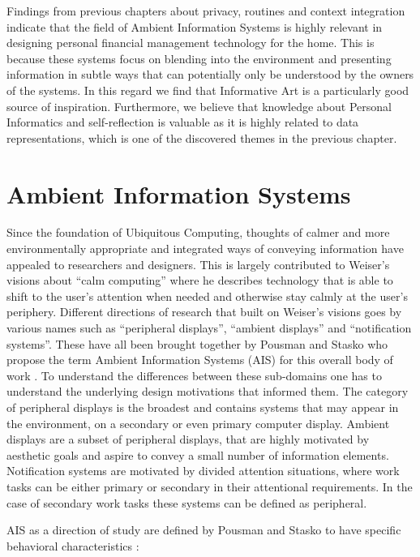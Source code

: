 Findings from previous chapters about privacy, routines and context integration indicate that the field of Ambient Information Systems is highly relevant in designing personal financial management technology for the home. This is because these systems focus on blending into the environment and presenting information in subtle ways that can potentially only be understood by the owners of the systems. In this regard we find that Informative Art is a particularly good source of inspiration. Furthermore, we believe that knowledge about Personal Informatics and self-reflection is valuable as it is highly related to data representations, which is one of the discovered themes in the previous chapter.

\section{Ambient Information Systems}
Since the foundation of Ubiquitous Computing, thoughts of calmer and more environmentally appropriate and integrated ways of conveying information have appealed to researchers and designers. This is largely contributed to Weiser’s visions about “calm computing” \cite{weiser1997coming} where he describes technology that is able to shift to the user’s attention when needed and otherwise stay calmly at the user’s periphery. Different directions of research that built on Weiser’s visions goes by various names such as “peripheral displays”, “ambient displays” and “notification systems”. These have all been brought together by Pousman and Stasko who propose the term Ambient Information Systems (AIS) for this overall body of work \cite{pousman2006taxonomy}. To understand the differences between these sub-domains one has to understand the underlying design motivations that informed them. The category of peripheral displays is the broadest and contains systems that may appear in the environment, on a secondary or even primary computer display. Ambient displays are a subset of peripheral displays, that are highly motivated by aesthetic goals and aspire to convey a small number of information elements. Notification systems are motivated by divided attention situations, where work tasks can be either primary or secondary in their attentional requirements. In the case of secondary work tasks these systems can be defined as peripheral.

AIS as a direction of study are defined by Pousman and Stasko to have specific behavioral characteristics \cite{pousman2006taxonomy}:

